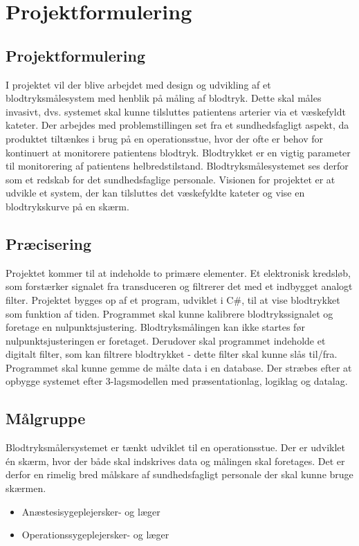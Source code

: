 \chapter{Projektformulering}\label{kapitel_Projektformulering}

\section{Projektformulering}
I projektet vil der blive arbejdet med design og udvikling af et blodtryksmålesystem med henblik på måling af blodtryk. Dette skal måles invasivt, dvs. systemet skal kunne tilsluttes patientens arterier via et væskefyldt kateter.
Der arbejdes med problemstillingen set fra et sundhedsfagligt aspekt, da produktet tiltænkes i brug på en operationsstue, hvor der ofte er behov for kontinuert at monitorere patientens blodtryk. Blodtrykket er en vigtig parameter til monitorering af patientens helbredstilstand. Blodtryksmålesystemet ses derfor som et redskab for det sundhedsfaglige personale.
Visionen for projektet er at udvikle et system, der kan tilsluttes det væskefyldte kateter og vise en blodtrykskurve på en skærm. 



\section{Præcisering}


Projektet kommer til at indeholde to primære elementer. Et elektronisk kredsløb, som forstærker signalet fra transduceren og filtrerer det med et indbygget analogt filter. Projektet bygges op af et program, udviklet i C$\#$, til at vise blodtrykket som funktion af tiden. Programmet skal kunne kalibrere blodtrykssignalet og foretage en nulpunktsjustering. Blodtryksmålingen kan ikke startes før nulpunktsjusteringen er foretaget. Derudover skal programmet indeholde et digitalt filter, som kan filtrere blodtrykket - dette filter skal kunne slås til/fra. Programmet skal kunne gemme de målte data i en database.
Der stræbes efter at opbygge systemet efter 3-lagsmodellen med præsentationlag, logiklag og datalag.  


\section{Målgruppe}
Blodtryksmålersystemet er tænkt udviklet til en operationsstue. Der er udviklet én skærm, hvor der både skal indskrives data og målingen skal foretages. Det er derfor en rimelig bred målskare af sundhedsfagligt personale der skal kunne bruge skærmen.
\begin{itemize}
\item Anæstesisygeplejersker- og læger
\item Operationssygeplejersker- og læger
\end{itemize}

 

